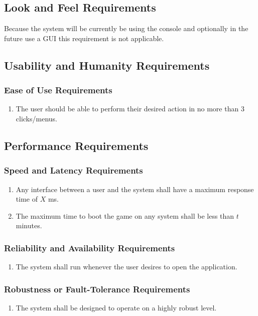 \documentclass[12pt, titlepage]{article}
\begin{document}
\subsection{Look and Feel Requirements}
    Because the system will be currently be using the console and optionally in the future use a GUI this requirement is not applicable. 
\subsection{Usability and Humanity Requirements}
    \subsubsection{Ease of Use Requirements}
        \label{ssub:ease_of_use_requirements}
        \begin{enumerate}[label=UH\arabic*.]
            \item The user should be able to perform their desired action in no more than 3 clicks/menus.
        \end{enumerate}
        

\subsection{Performance Requirements}
    \subsubsection{Speed and Latency Requirements}
    \begin{enumerate}[label=PR\arabic*.]
        \item Any interface between a user and the system shall have a maximum response time of $X$ ms.
        \item The maximum time to boot the game on any system shall be less than $t$ minutes.
    \end{enumerate}
    \subsubsection{Reliability and Availability Requirements}
    \begin{enumerate}[label=PR\arabic*.]
        \item The system shall run whenever the user desires to open the application.  
    \end{enumerate}
    \subsubsection{Robustness or Fault-Tolerance Requirements}
    \begin{enumerate}[label=PR\arabic*.]
        \item The system shall be designed to operate on a highly robust level.
    \end{enumerate}
\end{document}
